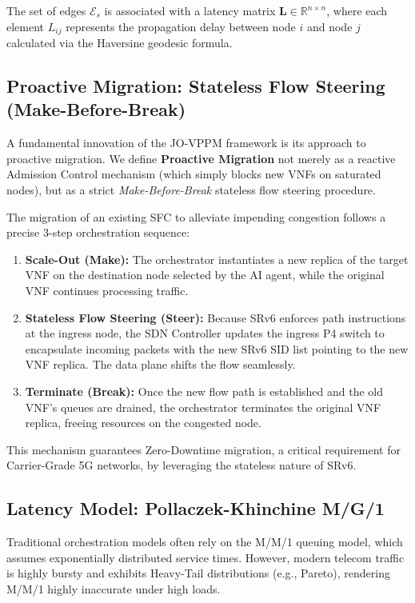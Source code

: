 The set of edges $\mathcal{E}_s$ is associated with a latency matrix $\mathbf{L} \in \mathbb{R}^{n \times n}$, where each element $L_{ij}$ represents the propagation delay between node $i$ and node $j$ calculated via the Haversine geodesic formula. 

\subsection{Proactive Migration: Stateless Flow Steering (Make-Before-Break)}
A fundamental innovation of the JO-VPPM framework is its approach to proactive migration. We define \textbf{Proactive Migration} not merely as a reactive Admission Control mechanism (which simply blocks new VNFs on saturated nodes), but as a strict \textit{Make-Before-Break} stateless flow steering procedure. 

The migration of an existing SFC to alleviate impending congestion follows a precise 3-step orchestration sequence:
\begin{enumerate}
    \item \textbf{Scale-Out (Make):} The orchestrator instantiates a new replica of the target VNF on the destination node selected by the AI agent, while the original VNF continues processing traffic.
    \item \textbf{Stateless Flow Steering (Steer):} Because SRv6 enforces path instructions at the ingress node, the SDN Controller updates the ingress P4 switch to encapsulate incoming packets with the new SRv6 SID list pointing to the new VNF replica. The data plane shifts the flow seamlessly.
    \item \textbf{Terminate (Break):} Once the new flow path is established and the old VNF's queues are drained, the orchestrator terminates the original VNF replica, freeing resources on the congested node.
\end{enumerate}

This mechanism guarantees Zero-Downtime migration, a critical requirement for Carrier-Grade 5G networks, by leveraging the stateless nature of SRv6.

\subsection{Latency Model: Pollaczek-Khinchine M/G/1}
Traditional orchestration models often rely on the M/M/1 queuing model, which assumes exponentially distributed service times. However, modern telecom traffic is highly bursty and exhibits Heavy-Tail distributions (e.g., Pareto), rendering M/M/1 highly inaccurate under high loads.

